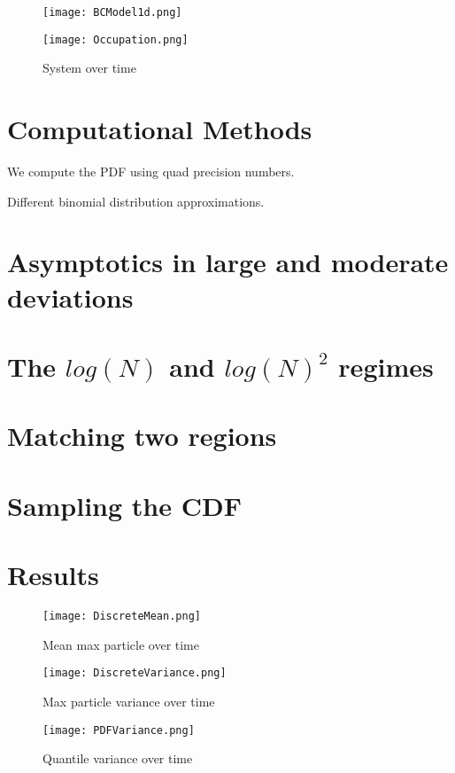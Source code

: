\documentclass[%
 reprint,
 amsmath,amssymb,
 longbibliography,
 aps,
]{revtex4-1}
\begin{document}
\begin{figure}[h]
  \texttt{[image: BCModel1d.png]}
\end{figure}

\begin{figure}[h]
  \texttt{[image: Occupation.png]}
  \caption{System over time}
\end{figure}

\section{Computational Methods}
We compute the PDF using quad precision numbers.

Different binomial distribution approximations.

\section{Asymptotics in large and moderate deviations}
\section{The $log(N)$ and $log(N)^2$ regimes}
\section{Matching two regions}
\section{Sampling the CDF}
\section{Results}

\begin{figure}[h]
  \texttt{[image: DiscreteMean.png]}
  \caption{Mean max particle over time}
\end{figure}

\begin{figure}[h]
  \texttt{[image: DiscreteVariance.png]}
  \caption{Max particle variance over time}
\end{figure}

\begin{figure}[h]
  \texttt{[image: PDFVariance.png]}
  \caption{Quantile variance over time}
\end{figure}
\end{document}
